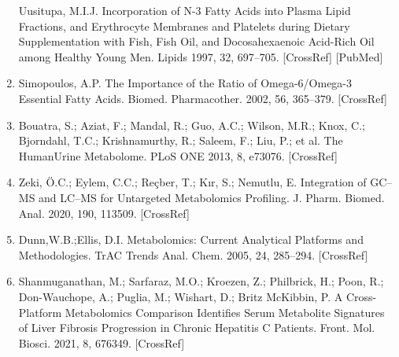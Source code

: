 \documentclass[journal=jacsat,manuscript=article]{achemso}
\begin{document}
\begin{enumerate}
  Uusitupa, M.I.J. Incorporation of N-3 Fatty Acids into Plasma Lipid
  Fractions, and Erythrocyte Membranes and Platelets during Dietary
  Supplementation with Fish, Fish Oil, and Docosahexaenoic Acid-Rich Oil
  among Healthy Young Men. Lipids 1997, 32, 697--705. {[}CrossRef{]}
  {[}PubMed{]}
\item
  Simopoulos, A.P. The Importance of the Ratio of Omega-6/Omega-3
  Essential Fatty Acids. Biomed. Pharmacother. 2002, 56, 365--379.
  {[}CrossRef{]}
\item
  Bouatra, S.; Aziat, F.; Mandal, R.; Guo, A.C.; Wilson, M.R.; Knox, C.;
  Bjorndahl, T.C.; Krishnamurthy, R.; Saleem, F.; Liu, P.; et al. The
  HumanUrine Metabolome. PLoS ONE 2013, 8, e73076. {[}CrossRef{]}
\item
  Zeki, Ö.C.; Eylem, C.C.; Reçber, T.; Kır, S.; Nemutlu, E. Integration
  of GC--MS and LC--MS for Untargeted Metabolomics Profiling. J. Pharm.
  Biomed. Anal. 2020, 190, 113509. {[}CrossRef{]}
\item
  Dunn,W.B.;Ellis, D.I. Metabolomics: Current Analytical Platforms and
  Methodologies. TrAC Trends Anal. Chem. 2005, 24, 285--294.
  {[}CrossRef{]}
\item
  Shanmuganathan, M.; Sarfaraz, M.O.; Kroezen, Z.; Philbrick, H.; Poon,
  R.; Don-Wauchope, A.; Puglia, M.; Wishart, D.; Britz McKibbin, P. A
  Cross-Platform Metabolomics Comparison Identifies Serum Metabolite
  Signatures of Liver Fibrosis Progression in Chronic Hepatitis C
  Patients. Front. Mol. Biosci. 2021, 8, 676349. {[}CrossRef{]}
\end{enumerate}
\end{document}
